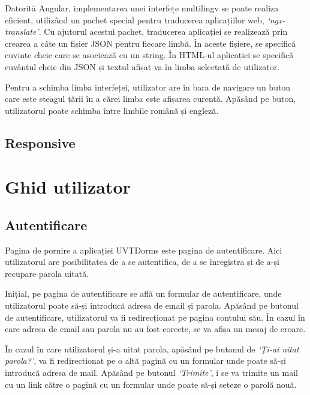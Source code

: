 \documentclass[12pt,a4paper]{report}
\theoremstyle{definition}
\theoremstyle{remark}
\begin{document}
\par Datorită Angular, implementarea unei interfețe multilingv se poate realiza eficient, utilizând un pachet special pentru traducerea aplicațiilor web, \textit{`ngx-translate'}\cite{ngx_translate}. Cu ajutorul acestui pachet, traducerea aplicației se realizează prin crearea a câte un fișier JSON pentru fiecare limbă. În aceste fișiere, se specifică cuvinte cheie care se asociează cu un string. În HTML-ul aplicației se specifică cuvântul cheie din JSON și textul afișat va în limba selectată de utilizator.

\par Pentru a schimba limba interfeței, utilizator are în bara de navigare un buton care este steagul țării în a cărei limba este afișarea curentă. Apăsând pe buton, utilizatorul poate schimba între limbile română și engleză.

\section{Responsive}
\chapter{Ghid utilizator}

\section{Autentificare}

\par Pagina de pornire a aplicației UVTDorms este pagina de autentificare. Aici utilizatorul are posibilitatea de a se autentifica, de a se înregistra și de a-și recupare parola uitată.

\par Inițial, pe pagina de autentificare se află un formular de autentificare, unde utilizatorul poate să-și introducă adresa de email și parola. Apăsând pe butonul de autentificare, utilizatorul va fi redirecționat pe pagina contului său. În cazul în care adresa de email sau parola nu au fost corecte, se va afișa un mesaj de eroare.


\par În cazul în care utilizatorul și-a uitat parola, apăsând pe butonul de \textit{`Ți-ai uitat parola?'}, va fi redirectionat pe o altă pagină cu un formular unde poate să-și introducă adresa de mail. Apăsând pe butonul \textit{`Trimite'}, i se va trimite un mail cu un link către o pagină cu un formular unde poate să-și seteze o parolă nouă.
\end{document}
